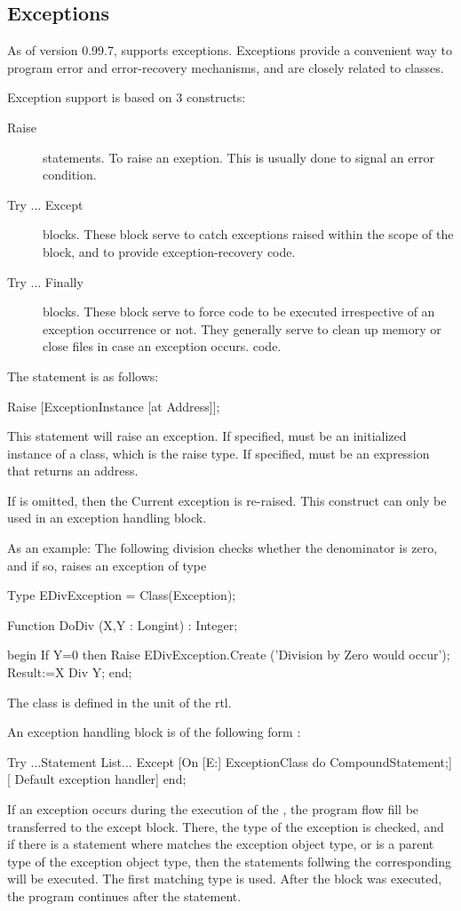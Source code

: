 \documentclass{report}
\begin{document}
\subsection{Exceptions}

As of version 0.99.7, \fpc supports exceptions. Exceptions provide a
convenient way to program error and error-recovery mechanisms, and are
closely related to classes. 

Exception support is based on 3 constructs:
\begin{description}
\item [Raise\ ] statements. To raise an exeption. This is usually done to signal an
error condition.
\item [Try ... Except\ ] blocks. These block serve to catch exceptions
raised within the scope of the block, and to provide exception-recovery 
code.
\item [Try ... Finally\ ] blocks. These block serve to force code to be
executed irrespective of an exception occurrence or not. They generally
serve to clean up memory or close files in case an exception occurs. 
code.
\end{description}

The  statement is as follows:
\begin{listing}
  Raise [ExceptionInstance [at Address]];
\end{listing}
This statement will raise an exception. If specified,  
must be an initialized instance of a class, which is the raise type. If
specified,  must be an expression that returns an address.

If  is omitted, then the Current exception is
re-raised. This construct can only be used in an exception handling
block.

As an example: The following division checks whether the denominator is
zero, and if so, raises an exception of type 
\begin{listing}
Type EDivException = Class(Exception);

Function DoDiv (X,Y : Longint) : Integer;

begin
  If Y=0 then 
    Raise EDivException.Create ('Division by Zero would occur');
  Result:=X Div Y;
end;
\end{listing}
The class  is defined in the  unit of the rtl.

An exception handling block is of the following form :
\begin{listing}
  Try
    ...Statement List...
  Except
    [On [E:] ExceptionClass do CompoundStatement;] 
    [ Default exception handler]
  end;
\end{listing}
If an exception occurs during the execution of the , the
program flow fill be transferred to the except block. There, the type of the
exception is checked, and if there is a  statement where
 matches the exception object type, or is a parent type of
the exception object type, then the statements follwing the corresponding 
 will be executed. The first matching type is used. After the
 block was executed, the program continues after the 
statement.
\end{document}
